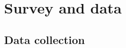 \documentclass[11pt]{article}
\begin{document}




\section{Survey and data}

    \subsection{Data collection}
\end{document}
